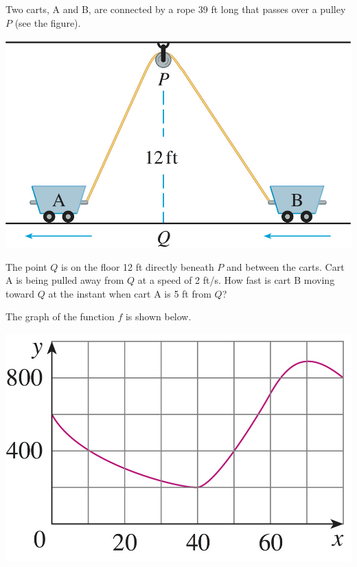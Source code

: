 \documentclass[12pt, addpoints]{exam/exam}
\newcommand{\1}{^{-1}}
\theoremstyle{plain}
\begin{document}
\begin{questions}
\thispagestyle{headandfoot}

\question[15] %
Two carts, A and B, are connected by a rope 39 %
 ft long that passes over a pulley $P$ (see the figure).
\vspace{-0.9pc}
\begin{center}
	\includegraphics[scale=4.1]{3-9_42Stewart8Ed.jpg}
\end{center}
\vspace{-0.9pc}

The point $Q$ is on the floor 12 ft directly beneath $P$ and between the carts.  Cart A is being pulled away from $Q$ at a speed of 2 %
ft/s.  How fast is cart B moving toward $Q$ at the instant when cart A is 5 ft from $Q$?

\vfill

\newpage
\question %
The graph of the function $f$ is shown below.
\begin{center}
\includegraphics[scale=4.5]{2-7_18Stewart8Ed}
\end{center}
	\begin{parts}

\end{parts}
\end{questions}
\end{document}
